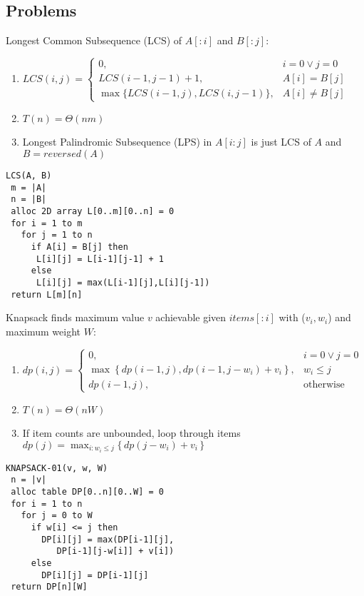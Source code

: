 \documentclass[12pt, a4paper]{article}
\begin{document}
\begin{multicols*}{3}
\subsection{Problems}

Longest Common Subsequence (LCS) of $A[:i]$ and $B[:j]$:
\begin{enumerate}[\roman*.]
  \item $LCS(i,j)=\begin{cases}
        0, &i=0\lor j=0\\
        LCS(i-1, j-1)+1,&A[i]=B[j]\\
        \max\{LCS(i-1, j), LCS(i, j-1)\},&A[i]\neq B[j]
      \end{cases}$
  \item $T(n) = \Theta(nm)$
  \item Longest Palindromic Subsequence (LPS) in $A[i:j]$ is just LCS of $A$ and $B = reversed(A)$
\end{enumerate}
\begin{lstlisting}
LCS(A, B)
 m = |A|
 n = |B|
 alloc 2D array L[0..m][0..n] = 0
 for i = 1 to m
   for j = 1 to n
     if A[i] = B[j] then
      L[i][j] = L[i-1][j-1] + 1
     else
      L[i][j] = max(L[i-1][j],L[i][j-1])
 return L[m][n]
\end{lstlisting}

\colbreak
Knapsack finds maximum value $v$ achievable given $items[:i]$ with ($v_i, w_i$) and maximum weight $W$:
\begin{enumerate}[\roman*.]
  \item $dp(i, j)=\begin{cases}
        0, &i=0\lor j=0\\
        \max\left\{\scriptstyle{dp(i-1, j), dp(i-1, j-w_i) + v_i} \right\},& w_i \leq j\\
        dp(i-1, j), &\text{otherwise}
      \end{cases}$
  \item $T(n) = \Theta(nW)$
  \item If item counts are unbounded, loop through items $dp(j)=\max_{i: w_i\le j}\{\,dp(j-w_i)+v_i\,\}$ 
\end{enumerate}
\begin{lstlisting}
KNAPSACK-01(v, w, W)
 n = |v|
 alloc table DP[0..n][0..W] = 0
 for i = 1 to n
   for j = 0 to W
     if w[i] <= j then
       DP[i][j] = max(DP[i-1][j],
          DP[i-1][j-w[i]] + v[i])
     else
       DP[i][j] = DP[i-1][j]
 return DP[n][W]
\end{lstlisting}


\end{multicols*}
\end{document}

